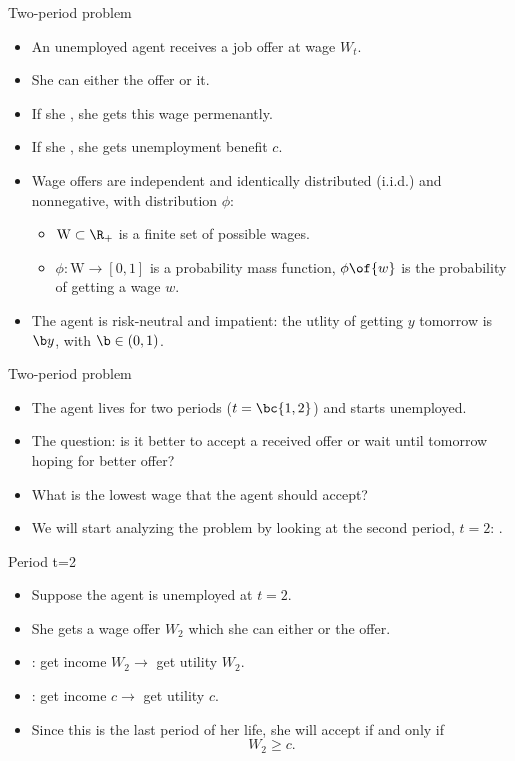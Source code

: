 \documentclass[11pt,xcolor={dvipsnames},aspectratio=159,hyperref={pdftex,pdfpagemode=UseNone,hidelinks,pdfdisplaydoctitle=true},usepdftitle=false]{beamer}
\begin{document}
\begin{frame}
    \end{frame}


\begin{frame}{Two-period problem}   
    \begin{itemize}
    \item  An unemployed agent receives a job offer at wage $W_t$.
    \item  She can either  the offer or  it.
    \item  If she , she gets this wage permenantly.
    \item  If she , she gets unemployment benefit $c$.
    \item  Wage offers are independent and identically distributed (i.i.d.) and nonnegative, with distribution $\phi$: 
        \begin{itemize}
            \item $\text{W} \subset \R_+$ is a finite set of possible wages.
            \item $\phi: \text{W} \to [0,1]$ is a probability mass function, $\phi\of{w}$ is the probability of getting a wage $w$.
        \end{itemize}
    \item The agent is risk-neutral and impatient: the utlity of getting $y$ tomorrow is $\b y$, with $\b \in (0,1)$.
\end{itemize}
\end{frame}

\begin{frame}{Two-period problem}   
    \begin{itemize}
    \item The agent lives for two periods ($t=\bc{1,2}$) and starts unemployed.
    \item The question: is it better to accept a received offer or wait until tomorrow hoping for better offer?
    \item What is the lowest wage that the agent should accept?
    \item We will start analyzing the problem by looking at the second period, $t=2$: .
    \end{itemize}
\end{frame}

\begin{frame}{Period t=2}
    \begin{itemize}
    \item Suppose the agent is unemployed at $t=2$.
    \item She gets a wage offer $W_2$ which she can either  or  the offer. 
    \item {}: get income $W_2 \rightarrow$ get utility $W_2$.
    \item {}: get income $c \rightarrow$ get utility $c$.
    \item Since this is the last period of her life, she will accept if and only if $$W_2 \geq c.$$
   \end{itemize}
\end{frame}
\end{document}
